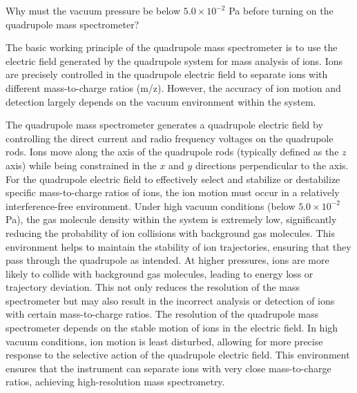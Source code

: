 \begin{question}
	Why must the vacuum pressure be below $5.0\times10^{-2}$ Pa before turning on the quadrupole mass spectrometer?
\end{question}


The basic working principle of the quadrupole mass spectrometer is to use the electric field generated by the quadrupole system for mass analysis of ions. Ions are precisely controlled in the quadrupole electric field to separate ions with different mass-to-charge ratios (m/z). However, the accuracy of ion motion and detection largely depends on the vacuum environment within the system.

The quadrupole mass spectrometer generates a quadrupole electric field by controlling the direct current and radio frequency voltages on the quadrupole rods. Ions move along the axis of the quadrupole rods (typically defined as the \(z\) axis) while being constrained in the \(x\) and \(y\) directions perpendicular to the axis. For the quadrupole electric field to effectively select and stabilize or destabilize specific mass-to-charge ratios of ions, the ion motion must occur in a relatively interference-free environment. Under high vacuum conditions (below \(5.0 \times 10^{-2}\) Pa), the gas molecule density within the system is extremely low, significantly reducing the probability of ion collisions with background gas molecules. This environment helps to maintain the stability of ion trajectories, ensuring that they pass through the quadrupole as intended. At higher pressures, ions are more likely to collide with background gas molecules, leading to energy loss or trajectory deviation. This not only reduces the resolution of the mass spectrometer but may also result in the incorrect analysis or detection of ions with certain mass-to-charge ratios. The resolution of the quadrupole mass spectrometer depends on the stable motion of ions in the electric field. In high vacuum conditions, ion motion is least disturbed, allowing for more precise response to the selective action of the quadrupole electric field. This environment ensures that the instrument can separate ions with very close mass-to-charge ratios, achieving high-resolution mass spectrometry.

